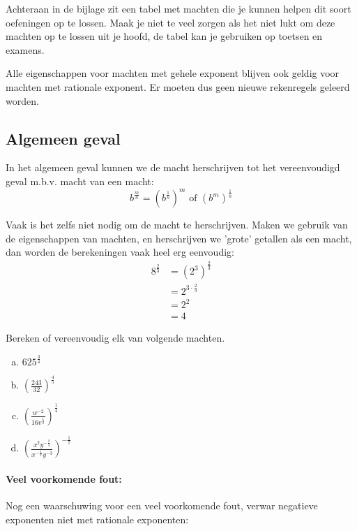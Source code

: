 \documentclass[12pt,twoside]{article}
\begin{document}
Achteraan in de bijlage zit een tabel met machten die je kunnen helpen dit soort oefeningen op te lossen. Maak je niet te veel zorgen als het niet lukt om deze machten op te lossen uit je hoofd, de tabel kan je gebruiken op toetsen en examens.

Alle eigenschappen voor machten met gehele exponent blijven ook geldig voor machten met rationale exponent. Er moeten dus geen nieuwe rekenregels geleerd worden.

\subsection{Algemeen geval}

In het algemeen geval kunnen we de macht herschrijven tot het vereenvoudigd geval m.b.v. macht van een macht:
$$b^{\frac{m}{n}} = \left(b^{\frac{1}{n}}\right)^m \text{ of } \left(b^m\right)^{\frac{1}{n}}$$

Vaak is het zelfs niet nodig om de macht te herschrijven. Maken we gebruik van de eigenschappen van machten, en herschrijven we 'grote' getallen als een macht, dan worden de berekeningen vaak heel erg eenvoudig:
\begin{align*}
  8^{\frac{2}{3}} &= \left(2^3\right)^{\frac{2}{3}}\\
                  &= 2^{3\cdot \frac{2}{3}}\\
                  &= 2^2\\
                  &= 4
\end{align*}

\begin{oefening}
  Bereken of vereenvoudig elk van volgende machten.
  \begin{multicols}{2}
    \begin{enumerate}[(a)]
      \itemsep1em
    \item $ {625^{\frac{3}{4}}}  $
    \item $ {\left( {\displaystyle \frac{{243}}{{32}}} \right)^{\frac{4}{5}}}  $
    \item $ {\left( {\displaystyle \frac{{{w^{ - 2}}}}{{16{v^{\frac{1}{2}}}}}} \right)^{\frac{1}{4}}}  $
    \item $ {\left( {\displaystyle \frac{{{x^2}{y^{ - \frac{2}{3}}}}}{{{x^{ - \frac{1}{2}}}{y^{ - 3}}}}} \right)^{ - \frac{1}{7}}}  $
    \end{enumerate}
  \end{multicols}
\end{oefening}

\paragraph{Veel voorkomende fout:} Nog een waarschuwing voor een veel voorkomende fout, verwar negatieve exponenten niet met rationale exponenten:
\end{document}
